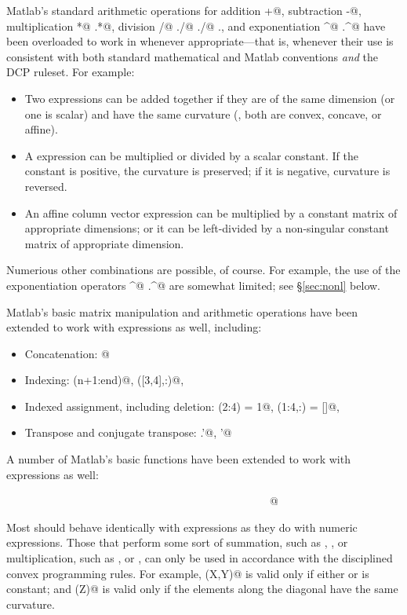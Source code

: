 \documentclass[12pt]{article}
\begin{document}
Matlab's standard arithmetic operations for
addition \verb@+@, subtraction \verb@-@, multiplication
\verb@*@ \verb@.*@, division \verb@/@ \verb@\@ \verb@./@
\verb@./@ \verb@.\@, and exponentiation \verb@^@ \verb@.^@
have been overloaded to work in \cvx whenever appropriate---that
is, whenever their use is consistent with both standard mathematical
and Matlab conventions \emph{and} the DCP ruleset.
For example:
\begin{itemize}
\item Two \cvx expressions can be added together if they are of the same
      dimension (or one is scalar) and have the same curvature (\ie, 
      both are convex, concave, or affine).
\item A \cvx expression can be multiplied or divided by a scalar constant. If the
      constant is positive, the curvature is preserved; if it is negative,
      curvature is reversed.      
\item An affine column vector \cvx expression can be multiplied by a constant matrix
      of appropriate dimensions; or it can be left-divided by a non-singular 
      constant matrix of appropriate dimension.
\end{itemize}
Numerious other combinations are possible, of course.
For example, the use of the exponentiation operators \verb@^@
\verb@.^@ are somewhat limited; see \S\ref{sec:nonl} below.

Matlab's basic matrix manipulation and arithmetic
operations have been extended to work with
\cvx expressions as well, including:
\begin{itemize}
\item Concatenation: \verb@[ A, B ; C, D ]@
\item Indexing: \verb@x(n+1:end)@, \verb@X([3,4],:)@, \etc
\item Indexed assignment, including deletion: \verb@y(2:4) = 1@, \verb@Z(1:4,:) = []@, \etc
\item Transpose and conjugate transpose: \verb@Z.'@, \verb@y'@
\end{itemize}
A number of Matlab's basic functions have been extended to work with \verb@cvx@
expressions as well:
\begin{center}
\verb@conj@\ \ \ \verb@conv@\ \ \ \verb@cumsum@\ \ \ \verb@diag@\ \ \ \verb@dot@\ \ \ 
\verb@find@\ \ \ \verb@fliplr@\ \ \ \verb@flipud@\ \ \ \verb@flipdim@\ \ \
\verb@horzcat@\ \ \ \verb@hankel@\ \ \ \verb@ipermute@\ \ \ \verb@kron@\ \ \
\verb@permute@\ \ \ \verb@repmat@\ \ \ \verb@reshape@\ \ \ @\ \ \
\verb@sparse@\ \ \ \verb@sum@\ \ \ \verb@trace@\ \ \ \verb@tril@\ \ \
\verb@triu@\ \ \ \verb@toeplitz@\ \ \ \verb@vertcat@
\end{center}
Most should behave identically with \cvx expressions as they do with numeric expressions.
Those that perform some sort of summation, such as \verb@cumsum@, \verb@sum@, or
multiplication, such as \verb@conv@, \verb@dot@ or \verb@kron@, can
only be used in accordance with the disciplined convex programming rules. For example,
\verb@kron(X,Y)@ is valid only if either \verb@X@ or \verb@Y@ is constant; and 
\verb@trace(Z)@ is valid only if the elements along the diagonal have the same curvature.
\end{document}
